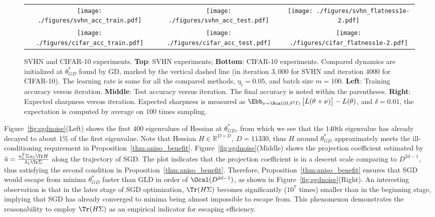 \documentclass{article}
\begin{document}
\begin{figure*}
\centering
\begin{tabular}{ccc}
    \texttt{[image: ./figures/svhn\_acc\_train.pdf]} &  \texttt{[image: ./figures/svhn\_acc\_test.pdf]} & \texttt{[image: ./figures/svhn\_flatness1e-2.pdf]}\\
    \texttt{[image: ./figures/cifar\_acc\_train.pdf]} &  \texttt{[image: ./figures/cifar\_acc\_test.pdf]} & \texttt{[image: ./figures/cifar\_flatness1e-2.pdf]}\\
\end{tabular}
\vspace{-4mm}
\caption{\small SVHN and CIFAR-10 experiments. 
\textbf{Top}: SVHN experiments;
\textbf{Bottom}: CIFAR-10 experiments.
Compared dynamics are initialized at $\theta^*_{GD}$ found by GD, marked by the vertical dashed line (in iteration $3,000$ for SVHN and iteration $4000$ for CIFAR-10).
The learning rate is same for all the compared methods, $\eta_t = 0.05$, and batch size $m=100$.
\textbf{Left}: Training accuracy versus iteration.
\textbf{Middle}: Test accuracy versus iteration. The final accuracy is noted within the parentheses.
\textbf{Right}: Expected sharpness versus iteration.
Expected sharpness is measured as $\Ebb_{\nu \sim \Ncal(0, \delta^2 I)} \left[ L(\theta + \nu)\right] - L(\theta)$, and $\delta=0.01$, the expectation is computed by average on $100$ times sampling.}
\label{fig:escape_svhn_cifar}
\vspace{-4mm}
\end{figure*}


Figure~\ref{fig:sgdnoise}(Left) shows the first $400$ eigenvalues of Hessian at $\theta^*_{GD}$, from which we see that the $140$th eigenvalue has already decayed to about $1\%$ of the first eigenvalue. Note that Hessian $H \in \mathbb{R}^{D\times D},\ D=11330$, thus $H$ around $\theta^*_{GD}$ approximately meets the ill-conditioning requirement in Proposition~{\ref{thm:aniso_benefit}}.
Figure~\ref{fig:sgdnoise}(Middle) shows the projection coefficient estimated by $\hat{a} = \frac{u_1^T \Sigma u_1 \Tr H}{\lambda_1 \Tr\Sigma}$ along the trajectory of SGD. The plot indicates that the projection coefficient is in a descent scale comparing to $D^{2d-1}$, thus satisfying the second condition in Proposition~\ref{thm:aniso_benefit}.
Therefore, Proposition~\ref{thm:aniso_benefit} ensures that SGD would escape from minima $\theta^*_{GD}$ faster than GLD in order of $\Ocal (D^{2d-1})$, as shown in Figure~\ref{fig:sgdnoise}(Right).
An interesting observation is that in the later stage of SGD optimization, $\Tr(H\Sigma)$ becomes significantly ($10^7$ times) smaller than in the beginning stage, implying that SGD has already converged to minima being almost impossible to escape from. This phenomenon demonstrates the reasonability to employ $\Tr(H\Sigma)$ as an empirical indicator for escaping efficiency.
\end{document}
